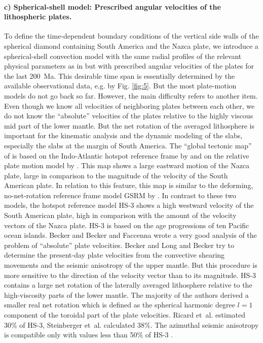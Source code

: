 \documentclass[twoside,10pt]{article}
\begin{document}
\paragraph{c) Spherical-shell model: Prescribed angular velocities of the lithospheric plates.} 
To define the time-dependent boundary conditions of the vertical side walls of the spherical diamond containing South America and the Nazca plate, we introduce a spherical-shell convection model with the same radial profiles of the relevant physical parameters as in \cite{Walzer2012,Walzer2012b} but with prescribed angular velocities of the plates for the last 200~Ma. This desirable time span is essentially determined by the available observational data, e.g. by Fig. \ref{fig:5}. 
But the most plate-motion models do not go back so far.
However, the main difficulty refers to another item.
Even though we know all velocities of neighboring plates between each other, we do not know the ``absolute'' velocities of the plates relative to the highly viscous mid part of the lower mantle. 
But the net rotation of the averaged lithosphere is important for the kinematic analysis and the dynamic modeling of the slabs, especially the slabs at the margin of South America.
The ``global tectonic map'' of \cite{Schellart2010} is based on the Indo-Atlantic hotspot reference frame by \cite{ONeill2005} and on the relative plate motion model by \cite{DeMets1994}. 
This map shows a large eastward motion of the Nazca plate, large in comparison to the magnitude of the velocity of the South American plate. 
In relation to this feature, this map is similar to the deforming, no-net-rotation reference frame model GSRM by \cite{Kreemer2003}.
In contrast to these two models, the hotspot reference model HS-3  \cite{Gripp2002} shows a high westward velocity of the South American plate, high in comparison with the amount of the velocity vectors of the Nazca plate.
HS-3 is based on the age progressions of ten Pacific ocean islands. Becker \cite{Becker2008} and Becker and Faccenna \cite{Becker2009} wrote a very good analysis of the problem of ``absolute'' plate velocities. 
Becker \cite{Becker2008} and Long and Becker \cite{Long2010} try to determine the present-day plate velocities from the convective shearing movements and the seismic anisotropy of the upper mantle.
But this procedure is more sensitive to the direction of the velocity vector than to its magnitude. 
HS-3 contains a large net rotation of the laterally averaged lithosphere relative to the high-viscosity parts of the lower mantle.
The majority of the authors derived a smaller real net rotation which is defined as the spherical harmonic degree $l=1$ component of the toroidal part of the plate velocities. 
Ricard et~al. \cite{Ricard1991} estimated 30\% of HS-3, Steinberger et~al. \cite{Steinberger2004} calculated 38\%.
The azimuthal seismic anisotropy is compatible only with values less than 50\% of HS-3 \cite{Becker2008}.
\end{document}
